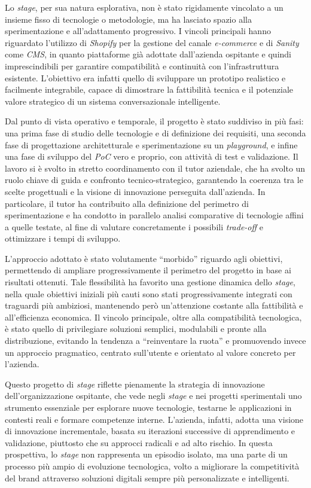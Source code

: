 Lo \emph{stage}, per sua natura esplorativa, non è stato rigidamente vincolato a un insieme fisso di tecnologie o metodologie, ma ha lasciato spazio alla 
sperimentazione e all’adattamento progressivo. I vincoli principali hanno riguardato l’utilizzo di \emph{Shopify} per la gestione del canale \emph{e-commerce} e di \emph{Sanity} 
come \emph{CMS}, in quanto piattaforme già adottate dall’azienda ospitante e quindi imprescindibili per garantire compatibilità e continuità con l’infrastruttura esistente. 
L’obiettivo era infatti quello di sviluppare un prototipo realistico e facilmente integrabile, capace di dimostrare la fattibilità tecnica e il potenziale valore strategico 
di un sistema conversazionale intelligente.

Dal punto di vista operativo e temporale, il progetto è stato suddiviso in più fasi: una prima fase di studio delle tecnologie e di definizione dei requisiti, 
una seconda fase di progettazione architetturale e sperimentazione su un \emph{playground}, e infine una fase di sviluppo del \emph{PoC} vero e proprio, con attività di test e validazione. 
Il lavoro si è svolto in stretto coordinamento con il tutor aziendale, che ha svolto un ruolo chiave di guida e confronto tecnico-strategico, garantendo la coerenza tra 
le scelte progettuali e la visione di innovazione perseguita dall’azienda. In particolare, il tutor ha contribuito alla definizione del perimetro di sperimentazione e 
ha condotto in parallelo analisi comparative di tecnologie affini a quelle testate, al fine di valutare concretamente i possibili \emph{trade-off} e ottimizzare i tempi di sviluppo.

L’approccio adottato è stato volutamente “morbido” riguardo agli obiettivi, permettendo di ampliare progressivamente il perimetro del progetto in base ai risultati ottenuti. 
Tale flessibilità ha favorito una gestione dinamica dello \emph{stage}, nella quale obiettivi iniziali più cauti sono stati progressivamente integrati con traguardi più ambiziosi, 
mantenendo però un’attenzione costante alla fattibilità e all’efficienza economica. Il vincolo principale, oltre alla compatibilità tecnologica, 
è stato quello di privilegiare soluzioni semplici, modulabili e pronte alla distribuzione, evitando la tendenza a “reinventare la ruota” e promuovendo invece un approccio pragmatico, 
centrato sull’utente e orientato al valore concreto per l’azienda.

Questo progetto di \emph{stage} riflette pienamente la strategia di innovazione dell’organizzazione ospitante, che vede negli \emph{stage} 
e nei progetti sperimentali uno strumento essenziale per esplorare nuove tecnologie, testarne le applicazioni in contesti reali e formare competenze interne. 
L’azienda, infatti, adotta una visione di innovazione incrementale, basata su iterazioni successive di apprendimento e validazione, piuttosto che su approcci 
radicali e ad alto rischio. In questa prospettiva, lo \emph{stage} non rappresenta un episodio isolato, ma una parte di un processo più ampio di evoluzione tecnologica, 
volto a migliorare la competitività del brand attraverso soluzioni digitali sempre più personalizzate e intelligenti.


